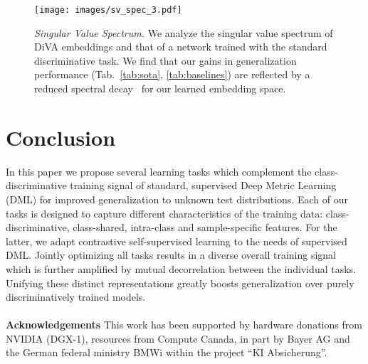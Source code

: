 \documentclass[runningheads]{llncs}
\begin{document}
\begin{SCfigure}
    \caption{\textit{Singular Value Spectrum.} We analyze the singular value spectrum of DiVA embeddings and that of a network trained with the standard discriminative task. We find that our gains in generalization performance (Tab.~\ref{tab:sota}, \ref{tab:baselines}) are reflected by a reduced spectral decay~\cite{roth2020revisiting} for our learned embedding space.}
    \texttt{[image: images/sv\_spec\_3.pdf]}
    \label{fig:sv_spec}
\end{SCfigure} 


\section{Conclusion}
\label{sec:Conclusion}
In this paper we propose several learning tasks which complement the class-discriminative training signal of standard, supervised Deep Metric Learning (DML) for improved generalization to unknown test distributions. Each of our tasks is designed to capture different characteristics of the training data: class-discriminative, class-shared, intra-class and sample-specific features. For the latter, we adapt contrastive self-supervised learning to the needs of supervised DML. Jointly optimizing all tasks results in a diverse overall training signal which is further amplified by mutual decorrelation between the individual tasks. Unifying these distinct representations greatly boosts generalization over purely discriminatively trained models. 
\\
\\
\textbf{Acknowledgements} 
This work has been supported by hardware donations from NVIDIA (DGX-1), resources from Compute Canada, in part by Bayer AG and the German federal ministry BMWi within the project “KI Absicherung”.

\clearpage


\end{document}
